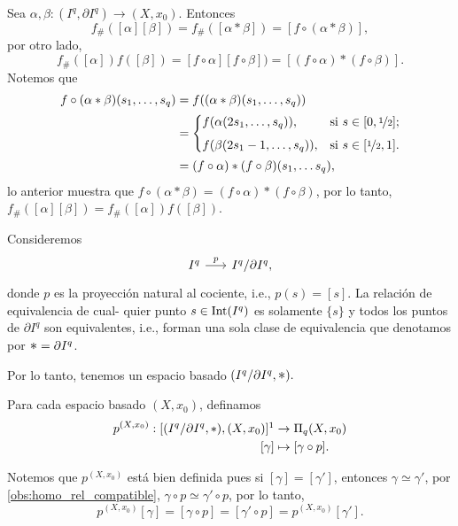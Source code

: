 \begin{dem}
    Sea $\alpha,\beta:(I^q,\partial I^q)\to(X,x_0)$. Entonces
    \begin{equation*}
        f_\#([\alpha][\beta])=f_\#([\alpha*\beta])=[f\circ (\alpha*\beta)],
    \end{equation*}
    por otro lado, 
    \begin{equation*}
        f_\#([\alpha])f([\beta])=[f\circ\alpha][f\circ\beta])=[(f\circ\alpha)*(f\circ\beta)].
    \end{equation*}
    Notemos que
    \begin{align*}
        f\circ (\alpha*\beta)(s_1,\ldots,s_q)&=f((\alpha*\beta)(s_1,\ldots,s_q))\\
        &=\begin{cases} 
                f(\alpha(2s_1,\ldots,s_q)), & \text{si } s\in[0,\nicefrac{1}{2}]; \\[1ex]
                f(\beta(2s_1-1,\ldots,s_q)), & \text{si } s\in [\nicefrac{1}{2},1]. 
            \end{cases}\\
        &=(f\circ \alpha)*(f\circ\beta)(s_1,\ldots s_q),
    \end{align*}
    lo anterior muestra que $f\circ (\alpha*\beta)=(f\circ \alpha)*(f\circ\beta)$, por lo tanto, $f_\#([\alpha][\beta])=f_\#([\alpha])f([\beta])$.
\end{dem}
\begin{definicion}
    Consideremos 
    \[
    \begin{tikzcd}[column sep=0.6cm] 
        I^q\arrow[r,"p"] & I^q/\partial I^q,
    \end{tikzcd}\]
    donde $p$ es la proyección natural al cociente, i.e., $p(s)=[s]$. La relación de equivalencia de cual- quier punto $s\in \mathrm{Int}(I^q)$ es solamente $\{s\}$ y todos los puntos de $\partial I^q$ son equivalentes, i.e., forman una sola clase de equivalencia que denotamos por $\bigast=\partial I^q$. 
    
    Por lo tanto, tenemos un espacio basado $(I^q/\partial I^q,\bigast).$
\end{definicion}
\begin{definicion}
    Para cada espacio basado $(X,x_0)$, definamos
        \begin{align*}
            p^{(X,x_0)}:[(I^q/\pIq,*),(X,x_0)]\footnotemark
            &\to\Pi_q(X,x_0)\\
            [\gamma]&\mapsto[\gamma\circ p].
        \end{align*}
\end{definicion}
Notemos que $p^{(X,x_0)}$ está bien definida pues si $[\gamma]=[\gamma']$, entonces $\gamma\simeq\gamma'$, por \ref{obs:homo_rel_compatible}, $\gamma\circ p\simeq\gamma'\circ p$, por lo tanto,
$$p^{(X,x_0)}[\gamma]=[\gamma\circ p]=[\gamma'\circ p]=p^{(X,x_0)}[\gamma'].$$

